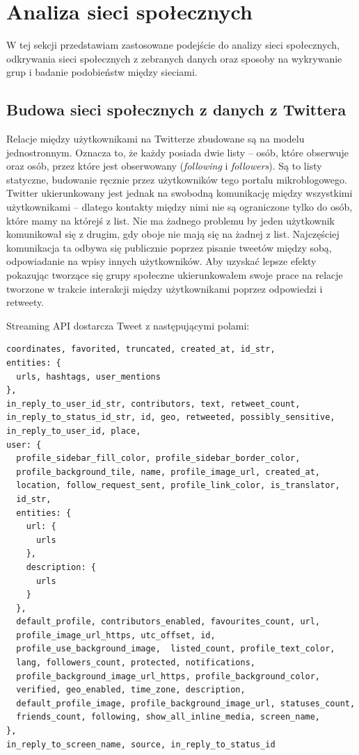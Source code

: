 \section{Analiza sieci społecznych}
\label{section:siecispoleczne}
W tej sekcji przedstawiam zastosowane podejście do analizy sieci społecznych,
odkrywania sieci społecznych z zebranych danych oraz sposoby na wykrywanie grup
i badanie podobieństw między sieciami.
\subsection{Budowa sieci społecznych z danych z Twittera}
Relacje między użytkownikami na Twitterze zbudowane są na modelu jednostronnym.
Oznacza to, że każdy posiada dwie listy -- osób, które obserwuje oraz osób,
przez które jest obserwowany (\textit{following} i \textit{followers}).
Są to listy statyczne, budowanie ręcznie przez użytkowników tego portalu
mikroblogowego. Twitter ukierunkowany jest jednak na swobodną komunikację między
wszystkimi użytkownikami -- dlatego kontakty między nimi nie są ograniczone
tylko do osób, które mamy na którejś z list. Nie ma żadnego problemu by jeden
użytkownik komunikował się z drugim, gdy oboje nie mają się na żadnej z list.
Najczęściej komunikacja ta odbywa się publicznie poprzez pisanie tweetów między
sobą, odpowiadanie na wpisy innych użytkowników. Aby uzyskać lepsze efekty
pokazując tworzące się grupy społeczne ukierunkowałem swoje prace na relacje
tworzone w trakcie interakcji między użytkownikami poprzez odpowiedzi i
retweety.

Streaming API dostarcza Tweet z następującymi polami: 
\begin{verbatim}
coordinates, favorited, truncated, created_at, id_str,
entities: {
  urls, hashtags, user_mentions
},
in_reply_to_user_id_str, contributors, text, retweet_count, 
in_reply_to_status_id_str, id, geo, retweeted, possibly_sensitive, 
in_reply_to_user_id, place,
user: {
  profile_sidebar_fill_color, profile_sidebar_border_color, 
  profile_background_tile, name, profile_image_url, created_at, 
  location, follow_request_sent, profile_link_color, is_translator,
  id_str, 
  entities: {
    url: {
      urls
    },
    description: {
      urls
    }
  },
  default_profile, contributors_enabled, favourites_count, url, 
  profile_image_url_https, utc_offset, id, 
  profile_use_background_image,  listed_count, profile_text_color, 
  lang, followers_count, protected, notifications, 
  profile_background_image_url_https, profile_background_color,
  verified, geo_enabled, time_zone, description,
  default_profile_image, profile_background_image_url, statuses_count,
  friends_count, following, show_all_inline_media, screen_name, 
},
in_reply_to_screen_name, source, in_reply_to_status_id
\end{verbatim} 

